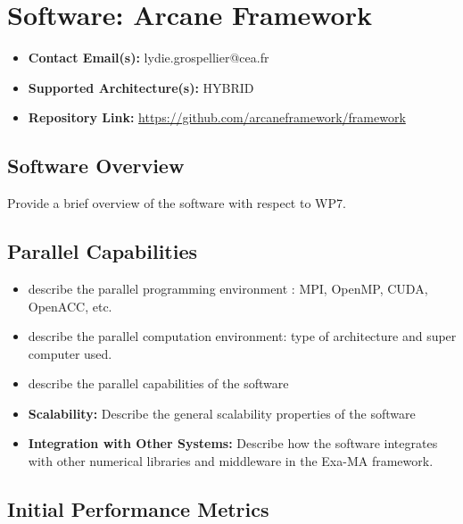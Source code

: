 \section{Software: Arcane Framework}
\label{sec:WP7:Arcane Framework:software}

\begin{itemize}
    \item \textbf{Contact Email(s):} lydie.grospellier@cea.fr
    \item \textbf{Supported Architecture(s):} HYBRID
    \item \textbf{Repository Link:} \href{https://github.com/arcaneframework/framework}{https://github.com/arcaneframework/framework}
\end{itemize}

\subsection{Software Overview}
\label{sec:WP7:Arcane Framework:summary}

Provide a brief overview of the software with respect to WP7.

\subsection{Parallel Capabilities}
\label{sec:WP7:Arcane Framework:performances}


\begin{itemize}
    \item describe the parallel programming  environment : MPI, OpenMP, CUDA, OpenACC, etc.
    \item describe the parallel computation environment: type of architecture and super computer used.
    \item describe the parallel capabilities of the software
    \item \textbf{Scalability:} Describe the general scalability properties of the software
    \item \textbf{Integration with Other Systems:} Describe how the software integrates with other numerical libraries and middleware in the Exa-MA framework.
\end{itemize}

\subsection{Initial Performance Metrics}
\label{sec:WP7:Arcane Framework:metrics}

